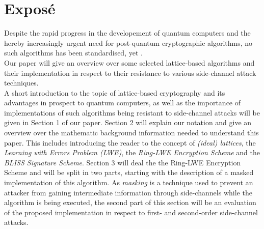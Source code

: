 %
%

\chapter{Expos\'{e}}
Despite the rapid progress in the developement of quantum computers and the hereby increasingly urgent need for post-quantum cryptographic algorithms, no such algorithms has been standardised, yet \cite{Nist}.\\
Our paper will give an overview over some selected lattice-based algorithms and their implementation in respect to their resistance to various side-channel attack techniques.\\
A short introduction to the topic of lattice-based cryptography and its advantages in prospect to quantum computers, %
as well as the importance of implementations of such algorithms being resistant to side-channel attacks will be given in Section 1 of our paper. Section 2 will explain our notation and give an overview over the mathematic background information needed to understand this paper. This includes introducing the reader to the concept of \textit{(ideal) lattices}, the \textit{Learning with Errors Problem (LWE)}, the \textit{Ring-LWE Encryption Scheme} and the \textit{BLISS Signature Scheme}. Section 3 will deal the the Ring-LWE Encryption Scheme and will be split in two parts, starting with the description of a masked implementation of this algorithm. As \textit{masking} is a technique used to prevent an attacker from gaining intermediate information through side-channels while the algorithm is being executed, the second part of this section will be an evaluation of the proposed implementation in respect to first- and second-order side-channel attacks.